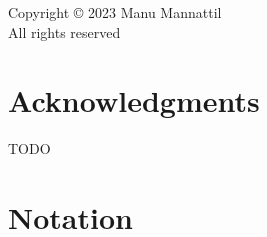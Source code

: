 
\newpage\thispagestyle{empty}

\begin{center*}
  \begin{Spacing}{1.25}
  Copyright {\copyright} 2023 Manu Mannattil\\
  All rights reserved
  \end{Spacing}
\end{center*}


\newpage\thispagestyle{empty}
\chapter*{Acknowledgments}

\sloppy
TODO

\ifdeadtree
  \blankpage
\fi


\newpage\pagestyle{headings}

\ifnotsu{\setlength{\cftbeforechapterskip}{0.5em}}

\tableofcontents


\chapter*{Notation}




\mainmatter

\pagestyle{headings}










\appendix

